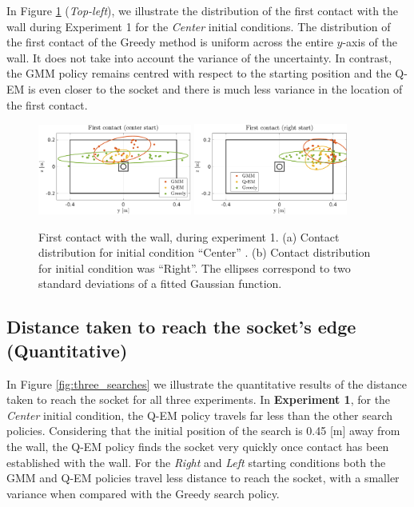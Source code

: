 \documentclass[final,3p,times,twocolumn]{elsarticle}
\begin{document}
In Figure \ref{fig:first_contact} (\textit{Top-left}), we illustrate the distribution of the first contact with the wall 
during Experiment 1 for the \textit{Center} initial conditions. The distribution of the first contact of the Greedy method is uniform across 
the entire $y$-axis of the wall. 
It does not take into account the variance of the uncertainty. In contrast, the GMM policy remains centred with respect to the starting position and the Q-EM is even closer to the socket and 
there is much less variance in the location of the first contact.

\begin{figure}
  \centering
   \includegraphics[width=0.45\textwidth]{./Figures/Fig/first_contact_center.pdf}
   \includegraphics[width=0.45\textwidth]{./Figures/Fig/first_contact_right.pdf}
   \caption{First contact with the wall, during experiment 1. (a) Contact distribution for initial condition ``Center'' . (b) 
   Contact distribution for initial condition was ``Right''. The ellipses correspond to two standard deviations of a fitted Gaussian 
   function.}
   \label{fig:first_contact}
\end{figure}

\subsection{Distance taken to reach the socket's edge (Quantitative)}

In Figure \ref{fig:three_searches} we illustrate the quantitative results of the distance taken 
to reach the socket for all three experiments. In \textbf{Experiment 1}, for the \textit{Center} initial condition,
the Q-EM policy travels far less than the other search policies. Considering that the initial position of the search is 
0.45 [m] away from the wall, the Q-EM policy finds the socket very quickly once contact has been established with the wall. 
For the \textit{Right} and \textit{Left} starting conditions both the GMM and Q-EM policies travel less distance to reach the socket, with a 
smaller variance when compared with the Greedy search policy.
\end{document}
